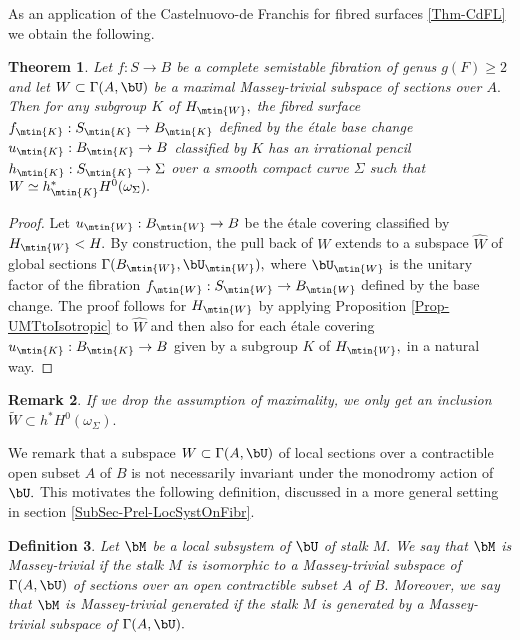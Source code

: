 \documentclass[a4paper,11pt]{amsart}
\newtheorem{theorem}{Theorem}[section]
\newtheorem{remark}[theorem]{Remark}
\newtheorem{definition}[theorem]{Definition}
\begin{document}
{ 					 As an application of the Castelnuovo-de Franchis for fibred surfaces \ref{Thm-CdFL} we obtain the following.     
 				
 				 
 					\begin{theorem}\label{Prop-MPpencils2} Let $f:S\to B$ be a complete semistable fibration of genus $g(F)\geq 2$ and let $W\subset \Gamma(A,\bU)$ be a maximal Massey-trivial subspace of sections over $A.$ Then for any subgroup $K$ of $H_{\mtin{W}},$  the fibred surface $f_{\mtin{K}}:S_{\mtin{K}}\to B_{\mtin{K}}$ defined by the \'{e}tale base change $u_{\mtin{K}}: B_{\mtin{K}}\to B$ classified by $K$ has an irrational pencil $h_{\mtin{K}}:S_{\mtin{K}}\to \Sigma$ over a smooth compact curve $\Sigma$ such that $W\simeq h_{\mtin{K}}^*H^0(\omega_{\Sigma}).$ 
 						
 					\end{theorem}
 					
 					\begin{proof}
 						Let $u_{\mtin{W}}:B_{\mtin{W}}\to B$ be the \'{e}tale covering classified by  $H_{\mtin{W}}< H.$ By construction, the pull back of $W$ extends to a subspace $\widehat{W}$ of global sections $\Gamma(B_{\mtin{W}},\bU_{\mtin{W}}),$ where  $\bU_{\mtin{W}}$ is the unitary factor of the fibration $f_{\mtin{W}}:S_{\mtin{W}}\to B_{\mtin{W}}$ defined by the base change. The proof follows for $H_{\mtin{W}}$ by applying Proposition \ref{Prop-UMTtoIsotropic} to $\widehat{W}$ and then also for each \'{e}tale covering $u_{\mtin{K}}:B_{\mtin{K}}\to B$ given by a subgroup $K$ of $H_{\mtin{W}},$ in a natural way.
 						
 					\end{proof}
 					
 					\begin{remark}\label{Rem-MPpencils} If we drop the assumption of maximality, we only get an inclusion $\widetilde{W}\subset h^*H^0(\omega_{\Sigma}).$ 
 					\end{remark}
 					We remark that a subspace $W\subset \Gamma(A, \bU)$ of local sections over a contractible open subset $A$ of $B$ is not necessarily invariant under the monodromy action of $\bU.$ This motivates the following definition, discussed in a more general setting in section \ref{SubSec-Prel-LocSystOnFibr}.
 					
 					\begin{definition}\label{Def-MTsubbundleB} 
 						Let $\bM$ be a local subsystem of $\bU$ of stalk $M.$ We say that $\bM$ is {\em Massey-trivial} if the stalk $M$ is isomorphic to a Massey-trivial subspace of  $\Gamma(A,\bU)$ of sections over an open contractible subset $A$ of $B.$ Moreover, we say that $\bM$ is {\em Massey-trivial generated} if the stalk $M$ is generated by a Massey-trivial subspace of $\Gamma(A,\bU).$  
 					\end{definition}  
 					
}
\end{document}
